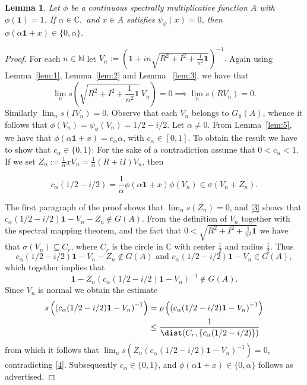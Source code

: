 \documentclass{amsart}
\newtheorem{lemma}[theorem]{Lemma}
\theoremstyle{definition}
\theoremstyle{remark}
\newcommand{\identity}{\mathbf{1}}
\begin{document}
  	
  	\begin{lemma}\label{no_zero}
  		Let  $\phi$ be a 
  		continuous   spectrally multiplicative  function $A$ with $\phi(\identity)=1$. If $\alpha \in \mathbb{C},$ and  $x\in A$  satisfies $\psi_\phi(x)=0 $, then $\phi(\alpha\mathbf{1}+ x)\in\{ 0,\alpha  \}.$
  	\end{lemma}
  	\begin{proof}
  		For each $n\in\mathbb N$ let $V_n:=\left(\mathbf{1}+in\sqrt{R^2+I^2+\frac{1}{n^2}\identity} \right)^{-1}.$
  		Again using Lemma~\ref{lem:1}, Lemma~\ref{lem:2} and Lemma~ \ref{lem:3}, we have that $$\lim_ns\left(\sqrt{R^2+I^2+\frac{1}{n^2}\identity}\, V_n\right)={0} \implies \lim_ns\left( R  V_n\right)=0.$$
  		Similarly  $\lim_ns\left( I  V_n\right)=0 $. Observe that each $V_n$ belongs to $ G_{\mathbf 1}(A)$, whence it follows that $\phi(V_n) = \psi_\phi(V_n)=1/2-i/2 $. Let $\alpha \neq 0 $. From Lemma~\ref{lem:5}, we have that $\phi(\alpha\mathbf{1}+x)=c_\alpha \alpha $, with $c_\alpha \in [0,1]$. To obtain the result we have to show that $c_\alpha \in \{0,1\}$: For the sake of a contradiction assume that $ 0< c_\alpha <1$. If we set $Z_n:=\frac{1}{\alpha}xV_n=\frac{1}{\alpha}(R+iI) V_n$, then
  		
  		\begin{equation}\label{3}
  			c_\alpha(1/2-i/2)=\frac{1}{\alpha}\phi(\alpha\mathbf{1}+x)\phi(V_n)\in \sigma\left(V_n+Z_n\right).
  		\end{equation}
  		
  		The first paragraph of the proof shows that $\lim_n s\left(Z_n\right)=0$, and \eqref{3} shows that 
  		$c_\alpha(1/2-i/2)\mathbf{1}-V_n-Z_n  \notin G(A) $. From the definition of $V_n$ together with the spectral mapping theorem, and the fact that $0<\sqrt{R^2+I^2+\frac{1}{n^2}\identity}$ we have that $\sigma\left(V_n\right) \subseteq C_r $, where $C_r$ is the circle in $\mathbb C$ with center $\frac{1}{2}$ and radius $\frac{1}{2}$. Thus $$c_\alpha(1/2-i/2)\mathbf{1} -V_n-Z_n \notin G(A) \mbox{ and } c_\alpha(1/2-i/2)\mathbf{1} -V_n \in G(A) ,$$ which together implies that 
  		\begin{equation}\label{4}
  		 \mathbf{1}-Z_n\left( c_\alpha(1/2-i/2)\mathbf{1} -V_n\right)^{-1} \notin G(A).
  		\end{equation}
  		Since $V_n$ is normal we obtain the estimate
  		\begin{align*}
  		s\left(\left( c_\alpha(1/2-i/2)\mathbf{1} -V_n\right)^{-1}\right)&=\rho\left( \left( c_\alpha(1/2-i/2)\mathbf{1} -V_n\right)^{-1} \right)\\& \leq \frac{1}{\dist(C_r,\{ c_\alpha(1/2-i/2) \} ) }
  		\end{align*}
  		from which it follows that $\lim_ns\left(  Z_n\left( c_\alpha(1/2-i/2)\mathbf{1} -V_n\right)^{-1}\right)=0$, contradicting \eqref{4}. Subsequently $c_\alpha \in \{0,1\}$, and $\phi(\alpha\mathbf{1}+x)\in \{0, \alpha \}$ follows as advertised. 
  	\end{proof}
  	
\end{document}

